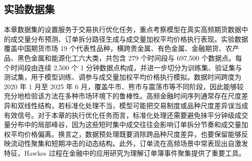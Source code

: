 \subsection{实验数据集}

本章数据集的设置服务于交易执行优化任务，重点考察模型在真实高频期货数据中的成交量分布预测、订单拆分路径生成与成交量加权平均价格执行表现。实验数据覆盖中国期货市场 19 个代表性品种，横跨贵金属、有色金属、金融期货、农产品、黑色金属和能源化工六大类，共包含 279 个时间段与 697,500 个数据点。每个时间段由连续 2,500 个 1 分钟数据点构成，并进一步切分为训练集、验证集与测试集，用于模型训练、调参与成交量加权平均价格执行模拟。数据时间跨度为 2020 年 1 月至 2025 年 6 月，覆盖牛市、熊市与震荡市等不同阶段，因此能够较充分地检验该方法在多种市场环境下的鲁棒性。高频金融时间序列通常存在尺度差异和双线性结构，若标准化处理不当，模型可能把交易制度或品种尺度差异误当成有效信号\cite{tran2021data}。对于本章的执行优化任务而言，标准化处理还需要避免抹平分钟级成交量分布中的局部峰谷，因为这些短时集中成交往往会影响订单拆分节奏和成交量加权平均价格偏离。换言之，数据预处理既要消除跨品种尺度差异，也要保留能够反映流动性聚集和短期冲击的动态结构。此外，订单流在高频场景中常表现出自激发特征，Hawkes 过程在金融中的应用研究为理解订单簿事件聚集提供了重要工具\cite{2015Hawkes}。



